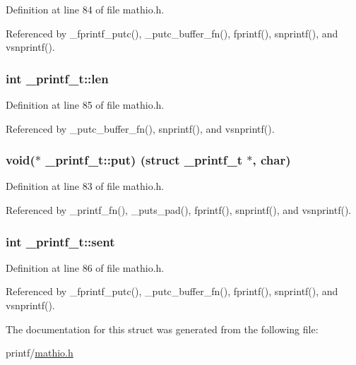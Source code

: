 Definition at line 84 of file mathio.\+h.



Referenced by \+\_\+fprintf\+\_\+putc(), \+\_\+putc\+\_\+buffer\+\_\+fn(), fprintf(), snprintf(), and vsnprintf().

\subsubsection[{\texorpdfstring{len}{len}}]{\setlength{\rightskip}{0pt plus 5cm}int \+\_\+printf\+\_\+t\+::len}\hypertarget{struct__printf__t_a5139902cde74159b79e6418a34712bee}{}\label{struct__printf__t_a5139902cde74159b79e6418a34712bee}


Definition at line 85 of file mathio.\+h.



Referenced by \+\_\+putc\+\_\+buffer\+\_\+fn(), snprintf(), and vsnprintf().

\subsubsection[{\texorpdfstring{put}{put}}]{\setlength{\rightskip}{0pt plus 5cm}void($\ast$ \+\_\+printf\+\_\+t\+::put) (struct {\bf \+\_\+printf\+\_\+t} $\ast$, char)}\hypertarget{struct__printf__t_a3ef8eb0143b93d4446b04c6ce9313be7}{}\label{struct__printf__t_a3ef8eb0143b93d4446b04c6ce9313be7}


Definition at line 83 of file mathio.\+h.



Referenced by \+\_\+printf\+\_\+fn(), \+\_\+puts\+\_\+pad(), fprintf(), snprintf(), and vsnprintf().

\subsubsection[{\texorpdfstring{sent}{sent}}]{\setlength{\rightskip}{0pt plus 5cm}int \+\_\+printf\+\_\+t\+::sent}\hypertarget{struct__printf__t_a872716fd701166cd57bd3fffb7b77706}{}\label{struct__printf__t_a872716fd701166cd57bd3fffb7b77706}


Definition at line 86 of file mathio.\+h.



Referenced by \+\_\+fprintf\+\_\+putc(), \+\_\+putc\+\_\+buffer\+\_\+fn(), fprintf(), snprintf(), and vsnprintf().



The documentation for this struct was generated from the following file\+:\begin{DoxyCompactItemize}
\item 
printf/\hyperlink{mathio_8h}{mathio.\+h}\end{DoxyCompactItemize}
